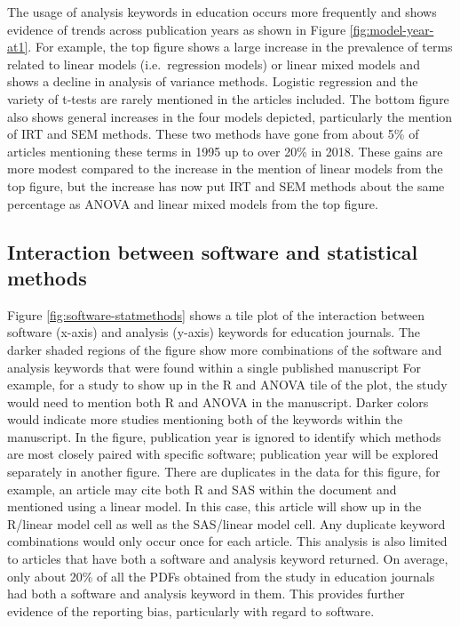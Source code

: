 \documentclass[
  english,
  ,man]{apa6}
\begin{document}
The usage of analysis keywords in education occurs more frequently and shows evidence of trends across publication years as shown in Figure \ref{fig:model-year-at1}. For example, the top figure shows a large increase in the prevalence of terms related to linear models (i.e.~regression models) or linear mixed models and shows a decline in analysis of variance methods. Logistic regression and the variety of t-tests are rarely mentioned in the articles included. The bottom figure also shows general increases in the four models depicted, particularly the mention of IRT and SEM methods. These two methods have gone from about 5\% of articles mentioning these terms in 1995 up to over 20\% in 2018. These gains are more modest compared to the increase in the mention of linear models from the top figure, but the increase has now put IRT and SEM methods about the same percentage as ANOVA and linear mixed models from the top figure.

\hypertarget{interaction-between-software-and-statistical-methods}{%
\subsection{Interaction between software and statistical methods}\label{interaction-between-software-and-statistical-methods}}

Figure \ref{fig:software-statmethods} shows a tile plot of the interaction between software (x-axis) and analysis (y-axis) keywords for education journals. The darker shaded regions of the figure show more combinations of the software and analysis keywords that were found within a single published manuscript For example, for a study to show up in the R and ANOVA tile of the plot, the study would need to mention both R and ANOVA in the manuscript. Darker colors would indicate more studies mentioning both of the keywords within the manuscript. In the figure, publication year is ignored to identify which methods are most closely paired with specific software; publication year will be explored separately in another figure. There are duplicates in the data for this figure, for example, an article may cite both R and SAS within the document and mentioned using a linear model. In this case, this article will show up in the R/linear model cell as well as the SAS/linear model cell. Any duplicate keyword combinations would only occur once for each article. This analysis is also limited to articles that have both a software and analysis keyword returned. On average, only about 20\% of all the PDFs obtained from the study in education journals had both a software and analysis keyword in them. This provides further evidence of the reporting bias, particularly with regard to software.
\end{document}
